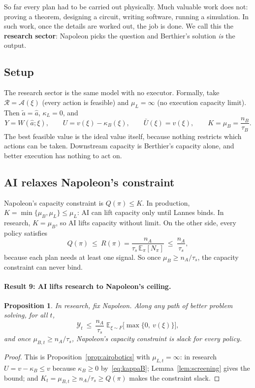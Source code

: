 \documentclass[11pt]{article}
\newcommand{\Nap}{\textcolor{nap}{Napoleon}}
\newcommand{\Ber}{\textcolor{ber}{Berthier}}
\newcommand{\Lan}{\textcolor{lan}{Lannes}}
\newtheorem{proposition}{Proposition}
\theoremstyle{remark}
\newcommand{\E}{\mathbb{E}}
\newcommand{\Ycal}{\mathcal{Y}}
\newcommand{\Rcal}{\mathcal{R}}
\newcommand{\Acal}{\mathcal{A}}
\begin{document}
So far every plan had to be carried out physically. Much valuable work does not: proving a theorem, designing a circuit, writing software, running a simulation. In such work, once the details are worked out, the job is done. We call this the \textbf{research sector}: \Nap{} picks the question and \Ber's solution \emph{is} the output.

\subsection{Setup}

The research sector is the same model with no executor. Formally, take $\Rcal=\Acal(\xi)$ (every action is feasible) and $\mu_L=\infty$ (no execution capacity limit). Then $\tilde a=\hat a$, $\kappa_L=0$, and
\[
Y=W(\hat a;\xi),\qquad U=v(\xi)-\kappa_B(\xi),\qquad \bar U(\xi)=v(\xi),\qquad K=\mu_B=\frac{n_B}{\tau_B}.
\]
The best feasible value is the ideal value itself, because nothing restricts which actions can be taken. Downstream capacity is \Ber's capacity alone, and better execution has nothing to act on.

\subsection{AI relaxes Napoleon's constraint}

\Nap's capacity constraint is $Q(\pi)\le K$. In production, $K=\min\{\mu_B,\mu_L\}\le\mu_L$: AI can lift capacity only until \Lan{} binds. In research, $K=\mu_B$, so AI lifts capacity without limit. On the other side, every policy satisfies
\[
Q(\pi)\ \le\ R(\pi)=\frac{n_A}{\tau_s\,\E_\pi[N_\pi]}\ \le\ \frac{n_A}{\tau_s},
\]
because each plan needs at least one signal. So once $\mu_B\ge n_A/\tau_s$, the capacity constraint can never bind.

\paragraph{Result 9: AI lifts research to \Nap's ceiling.}

\begin{proposition}\label{prop:resceiling}
In research, fix \Nap. Along any path of better problem solving, for all $t$,
\[
\Ycal_t\ \le\ \frac{n_A}{\tau_s}\;\E_{\xi\sim F}\big[\max\{0,\ v(\xi)\}\big],
\]
and once $\mu_{B,t}\ge n_A/\tau_s$, \Nap's capacity constraint is slack for every policy.
\end{proposition}

\begin{proof}
This is Proposition~\ref{prop:airobotics} with $\mu_{L,t}=\infty$: in research $U=v-\kappa_B\le v$ because $\kappa_B\ge0$ by~\eqref{eq:kappaB}; Lemma~\ref{lem:screening} gives the bound; and $K_t=\mu_{B,t}\ge n_A/\tau_s\ge Q(\pi)$ makes the constraint slack.
\end{proof}
\end{document}
